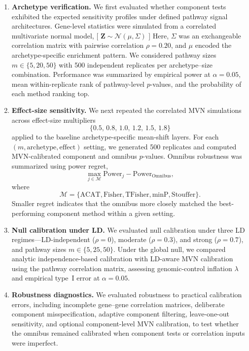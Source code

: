 \documentclass[unnumsec,webpdf,contemporary,large]{oup-authoring-template}%
\theoremstyle{thmstyleone}%
\theoremstyle{thmstyletwo}%
\theoremstyle{thmstylethree}%
\begin{document}
\begin{enumerate}
\item \textbf{Archetype verification.}
We first evaluated whether component tests exhibited the expected sensitivity profiles under defined pathway signal architectures. Gene-level statistics were simulated from a correlated multivariate normal model,
[
$\mathbf{Z} \sim \mathcal{N}(\mu,\Sigma)$
]
Here, $\Sigma$ was an exchangeable correlation matrix with pairwise correlation $\rho=0.20$, and $\mu$ encoded the archetype-specific enrichment pattern. We considered pathway sizes $m \in \{5,20,50\}$ with 500 independent replicates per archetype–size combination. Performance was summarized by empirical power at $\alpha=0.05$, mean within-replicate rank of pathway-level $p$-values, and the probability of each method ranking top.

\item \textbf{Effect-size sensitivity.}
We next repeated the correlated MVN simulations across effect-size multipliers
\[
\{0.5,\,0.8,\,1.0,\,1.2,\,1.5,\,1.8\}
\]
applied to the baseline archetype-specific mean-shift layers. For each $(m,\mathrm{archetype},\mathrm{effect})$ setting, we generated 500 replicates and computed MVN-calibrated component and omnibus $p$-values. Omnibus robustness was summarized using power regret,
\[
\max_{j \in \mathcal{M}} \mathrm{Power}_j - \mathrm{Power}_{\mathrm{Omnibus}},
\]
where
\[
\mathcal{M}
=
\{\mathrm{ACAT},\mathrm{Fisher},\mathrm{TFisher},\mathrm{minP},\mathrm{Stouffer}\}.
\]
Smaller regret indicates that the omnibus more closely matched the best-performing component method within a given setting.

\item \textbf{Null calibration under LD.}
We evaluated null calibration under three LD regimes—LD-independent ($\rho=0$), moderate ($\rho=0.3$), and strong ($\rho=0.7$), and pathway sizes $m \in \{5,25,50\}$. Under the global null, we compared analytic independence-based calibration with LD-aware MVN calibration using the pathway correlation matrix, assessing genomic-control inflation $\lambda$ and empirical type~I error at $\alpha=0.05$.

\item \textbf{Robustness diagnostics.}
We evaluated robustness to practical calibration errors, including incomplete gene–gene correlation matrices, deliberate component misspecification, adaptive component filtering, leave-one-out sensitivity, and optional component-level MVN calibration, to test whether the omnibus remained calibrated when component tests or correlation inputs were imperfect.


\end{enumerate}
\end{document}
